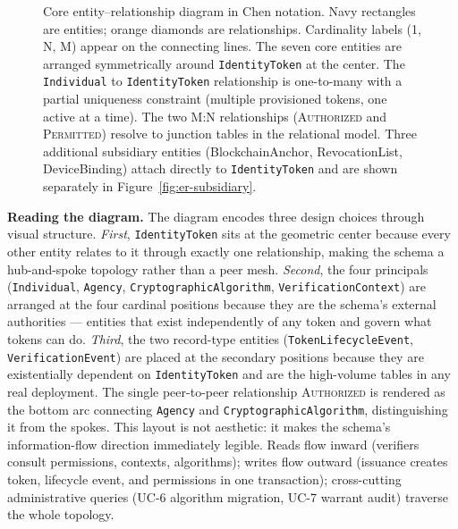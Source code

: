\documentclass[11pt,letterpaper]{article}
\newcommand{\entity}[1]{\texttt{\color{navydark}#1}}
\begin{document}
\begin{figure}[H]

\caption{Core entity--relationship diagram in Chen notation. Navy rectangles are entities; orange diamonds are relationships. Cardinality labels (1, N, M) appear on the connecting lines. The seven core entities are arranged symmetrically around \entity{IdentityToken} at the center. The \entity{Individual} to \entity{IdentityToken} relationship is one-to-many with a partial uniqueness constraint (multiple provisioned tokens, one active at a time). The two M:N relationships (\textsc{Authorized} and \textsc{Permitted}) resolve to junction tables in the relational model. Three additional subsidiary entities (BlockchainAnchor, RevocationList, DeviceBinding) attach directly to \entity{IdentityToken} and are shown separately in Figure~\ref{fig:er-subsidiary}.}
\label{fig:er-core}
\end{figure}


\textbf{Reading the diagram.} The diagram encodes three design choices through visual structure. \textit{First}, \entity{IdentityToken} sits at the geometric center because every other entity relates to it through exactly one relationship, making the schema a hub-and-spoke topology rather than a peer mesh. \textit{Second}, the four principals (\entity{Individual}, \entity{Agency}, \entity{CryptographicAlgorithm}, \entity{VerificationContext}) are arranged at the four cardinal positions because they are the schema's external authorities --- entities that exist independently of any token and govern what tokens can do. \textit{Third}, the two record-type entities (\entity{TokenLifecycleEvent}, \entity{VerificationEvent}) are placed at the secondary positions because they are existentially dependent on \entity{IdentityToken} and are the high-volume tables in any real deployment. The single peer-to-peer relationship \textsc{Authorized} is rendered as the bottom arc connecting \entity{Agency} and \entity{CryptographicAlgorithm}, distinguishing it from the spokes. This layout is not aesthetic: it makes the schema's information-flow direction immediately legible. Reads flow inward (verifiers consult permissions, contexts, algorithms); writes flow outward (issuance creates token, lifecycle event, and permissions in one transaction); cross-cutting administrative queries (UC-6 algorithm migration, UC-7 warrant audit) traverse the whole topology.
\end{document}
